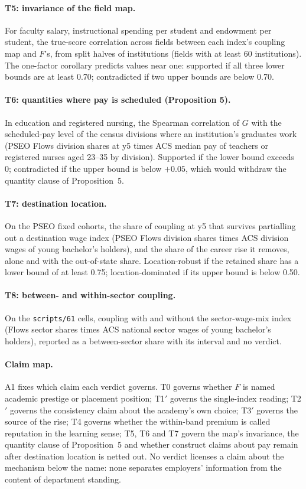 \paragraph{T5: invariance of the field map.} For faculty salary, instructional spending per student and endowment
per student, the true-score correlation across fields between each index's coupling map and $F$'s, from split
halves of institutions (fields with at least 60 institutions). The one-factor corollary predicts values near one:
supported if all three lower bounds are at least 0.70; contradicted if two upper bounds are below 0.70.

\paragraph{T6: quantities where pay is scheduled (Proposition 5).} In education and registered nursing, the
Spearman correlation of $G$ with the scheduled-pay level of the census divisions where an institution's graduates
work (PSEO Flows division shares at y5 times ACS median pay of teachers or registered nurses aged 23--35 by
division). Supported if the lower bound exceeds 0; contradicted if the upper bound is below $+0.05$, which would
withdraw the quantity clause of Proposition~5.

\paragraph{T7: destination location.} On the PSEO fixed cohorts, the share of coupling at y5 that survives
partialling out a destination wage index (PSEO Flows division shares times ACS division wages of young bachelor's
holders), and the share of the career rise it removes, alone and with the out-of-state share. Location-robust if the
retained share has a lower bound of at least 0.75; location-dominated if its upper bound is below 0.50.

\paragraph{T8: between- and within-sector coupling.} On the \texttt{scripts/61} cells, coupling with and without the
sector-wage-mix index (Flows sector shares times ACS national sector wages of young bachelor's holders), reported as
a between-sector share with its interval and no verdict.

\paragraph{Claim map.} A1 fixes which claim each verdict governs. T0 governs whether $F$ is named academic prestige
or placement position; T1$'$ governs the single-index reading; T2$'$ governs the consistency claim about the
academy's own choice; T3$'$ governs the source of the rise; T4 governs whether the within-band premium is called
reputation in the learning sense; T5, T6 and T7 govern the map's invariance, the quantity clause of Proposition~5
and whether construct claims about pay remain after destination location is netted out. No verdict licenses a
claim about the mechanism below the name: none separates employers' information from the content of department
standing.


